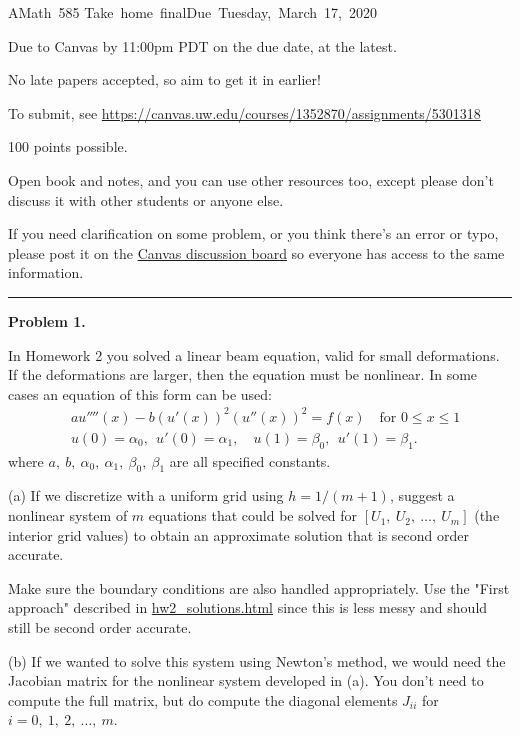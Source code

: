 \documentclass[10pt]{article}
\begin{document}
\hfill\vbox{\hbox{AMath 585}
\hbox{Take home final}\hbox{Due Tuesday, March 17, 2020}}

\vskip 5pt

Due to Canvas by 11:00pm PDT on the due date, at the latest.

No late papers accepted, so aim to get it in earlier!

To submit, see
\url{https://canvas.uw.edu/courses/1352870/assignments/5301318}

100 points possible.  

Open book and notes, and you can use other resources too, except please don't discuss it with other students or anyone else.

If you need clarification on some problem, or you think there's an error or
typo, please post it on the 
\href{https://canvas.uw.edu/courses/1352870/discussion_topics}{Canvas discussion board}
so everyone has access to the same information.

\vskip 1cm
\hrule
{\bf Problem 1.}

In Homework 2 you solved a linear beam equation, valid for small deformations.
If the deformations are larger, then the equation must be nonlinear.  In some
cases an equation of this form can be used:
\begin{align*}
&a u''''(x) - b(u'(x))^2 (u''(x))^2 = f(x) \quad\text{for~} 0\leq x \leq 1\\
&u(0) = \alpha_0,~~u'(0) = \alpha_1, \quad
u(1) = \beta_0,~~u'(1) = \beta_1.
\end{align*}
where $a,~b,~\alpha_0,~\alpha_1,~\beta_0,~\beta_1$ are all specified constants.

(a) If we discretize with a uniform grid using $h=1/(m+1)$, suggest a 
nonlinear system of $m$ equations that could be solved for 
$[U_1,~U_2,~\ldots,~U_m]$ (the interior grid values) 
to obtain an approximate solution that is second order accurate.  

Make sure the boundary conditions are also handled appropriately.
Use the "First approach" described in 
\href{http://staff.washington.edu/rjl/classes/am585w2020/solutions/hw2\_solutions.html}{hw2\_solutions.html} 
since this is less messy and should still be second order accurate.


(b) If we wanted to solve this system using Newton's method, we would need
the Jacobian matrix for the nonlinear system developed in (a).  
You don't need to compute the full matrix,
but do compute the diagonal elements $J_{ii}$ for $i=0,~1,~2,~\ldots,~m$.
\end{document}
